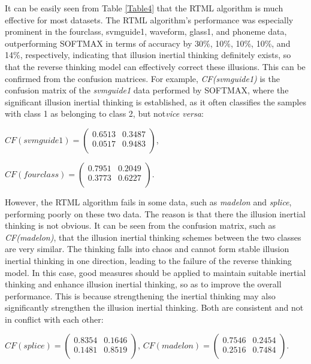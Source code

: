  It can be easily seen from Table \ref{Table4} that the RTML algorithm is much effective for most datasets.  The RTML algorithm's performance was especially prominent in the fourclass, svmguide1, waveform, glass1, and phoneme data, outperforming SOFTMAX in terms of accuracy by 30\%, 10\%, 10\%, 10\%, and 14\%, respectively, indicating that illusion inertial thinking definitely exists, so that the reverse thinking model can effectively correct these illusions. This can be confirmed from the confusion matrices. For example, \emph{CF(svmguide1)} is the confusion matrix of the \emph{svmguide1} data performed by SOFTMAX, where the significant illusion inertial thinking is established, as it often classifies the samples with class 1 as belonging to class 2, but not\textit{vice versa}:

$CF(svmguide1)=\left(
  \begin{array}{cc}
     0.6513  &  0.3487 \\
     0.0517 &   0.9483 \\
  \end{array}
\right)
$,

$CF(fourclass)=\left(
  \begin{array}{cc}
    0.7951  &  0.2049 \\
     0.3773  &  0.6227 \\
  \end{array}
\right)
$.

However, the RTML algorithm fails in some data, such as \emph{madelon} and \emph{splice}, performing poorly on these two data. The reason is that there the illusion inertial thinking is not obvious. It can be seen from the confusion matrix, such as \emph{CF(madelon)}, that the illusion inertial thinking schemes between the two classes are very similar. The thinking falls into chaos and cannot form stable illusion inertial thinking in one direction, leading to the failure of the reverse thinking model. In this case, good measures should be applied to maintain suitable inertial thinking and enhance illusion inertial thinking, so as to improve the overall performance. This is because strengthening the inertial thinking may also significantly strengthen the illusion inertial thinking. Both are consistent and not in conflict with each other:

$CF(splice)=\left(
  \begin{array}{cc}
            0.8354 &   0.1646\\
        0.1481  &  0.8519\\
  \end{array}
\right)
$,
$CF(madelon)=\left(
  \begin{array}{cc}
   0.7546   & 0.2454\\
    0.2516 &   0.7484\\
  \end{array}
\right)
$.

